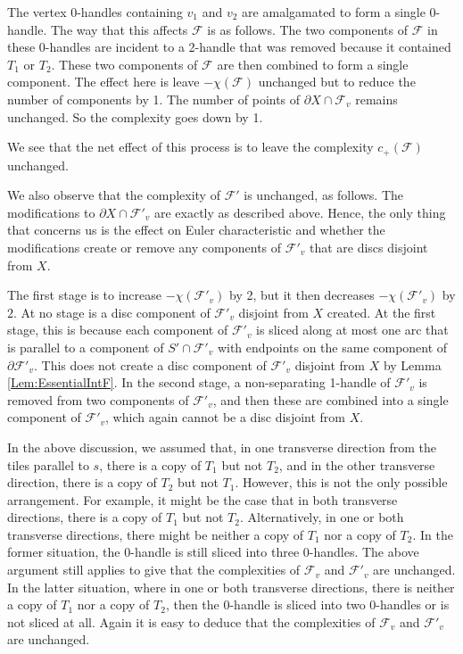 \documentclass[oneside]{amsart}
\numberwithin{equation}{section}
\theoremstyle{plain}
\theoremstyle{definition}
\newcommand{\calF}{\mathcal{F}}
\begin{document}
The vertex 0-handles containing $v_1$ and $v_2$ are amalgamated to
form a single 0-handle. The way that this affects $\mathcal{F}$ is as follows.
The two components of $\mathcal{F}$ in these 0-handles are incident to
a 2-handle that was removed because it contained $T_1$ or $T_2$.
These two components of $\mathcal{F}$ are then combined to form a
single component. The effect here is leave $-\chi(\mathcal{F})$ unchanged
but to reduce the number of components by 1. The number of points
of $\partial X \cap \calF_v$ remains unchanged. So the complexity goes down by 1.

We see that the net effect of this process is to leave the complexity
$c_+(\mathcal{F})$ unchanged.

We also observe that the complexity of $\mathcal{F}'$ is unchanged, as follows.
The modifications to $\partial X \cap \calF'_v$ are exactly as described above.
Hence, the only
thing that concerns us is the effect on Euler characteristic and whether
the modifications create or remove any components of $\mathcal{F}'_v$ that
are discs disjoint from $X$.

The first stage is to increase $-\chi(\mathcal{F}'_v)$ by 2, but it then decreases $-\chi(\mathcal{F}'_v)$ by $2$.
At no stage is a disc component of $\mathcal{F}'_v$ disjoint from $X$ created. At the first stage,
this is because each component of $\calF'_v$ is sliced along at most one arc that is parallel to a component
of $S' \cap \calF'_v$ with endpoints on the same component of $\partial \calF'_v$. This does not
create a disc component of $\mathcal{F}'_v$ disjoint from $X$ by Lemma \ref{Lem:EssentialIntF}.
In the second stage, a non-separating 1-handle of $\calF'_v$ is removed from two components of $\calF'_v$,
and then these are combined into a single component of $\calF'_v$, which again cannot be a disc
disjoint from $X$.


In the above discussion, we assumed that, in one transverse direction from the tiles parallel
to $s$, there is a copy of $T_1$ but not $T_2$, and in the other transverse direction, there is a
copy of $T_2$ but not $T_1$. However, this is not the only possible arrangement. For example,
it might be the case that in both transverse directions, there is a copy of $T_1$ but not $T_2$.
Alternatively, in one or both transverse directions, there might be neither a copy of $T_1$ nor
a copy of $T_2$. In the former situation, the 0-handle is still sliced into three 0-handles. The
above argument still applies to give that the complexities of $\mathcal{F}_v$ and $\mathcal{F}'_v$ are
unchanged. In the latter situation, where in one or both transverse directions, there is neither
a copy of $T_1$ nor a copy of $T_2$, then the 0-handle is sliced into two 0-handles or is not sliced at all.
Again it is easy to deduce that the complexities of $\mathcal{F}_v$ and $\mathcal{F}'_v$ are
unchanged.
\end{document}
